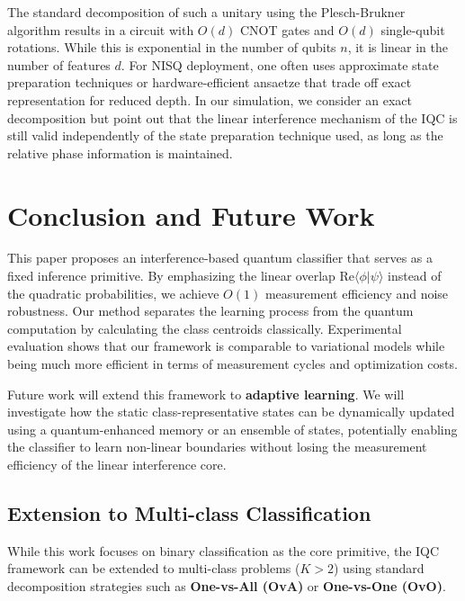\documentclass[conference]{IEEEtran}
\begin{document}
The standard decomposition of such a unitary using the Plesch-Brukner algorithm \cite{plesch2011quantum} results in a circuit with $O(d)$ CNOT gates and $O(d)$ single-qubit rotations. While this is exponential in the number of qubits $n$, it is linear in the number of features $d$. For NISQ deployment, one often uses approximate state preparation techniques or hardware-efficient ansaetze that trade off exact representation for reduced depth. In our simulation, we consider an exact decomposition but point out that the linear interference mechanism of the IQC is still valid independently of the state preparation technique used, as long as the relative phase information is maintained.

\section{Conclusion and Future Work}

This paper proposes an interference-based quantum classifier that serves as a fixed inference primitive. By emphasizing the linear overlap $\mathrm{Re}\langle \phi | \psi \rangle$ instead of the quadratic probabilities, we achieve $O(1)$ measurement efficiency and noise robustness. Our method separates the learning process from the quantum computation by calculating the class centroids classically. Experimental evaluation shows that our framework is comparable to variational models while being much more efficient in terms of measurement cycles and optimization costs.

Future work will extend this framework to \textbf{adaptive learning}. We will investigate how the static class-representative states can be dynamically updated using a quantum-enhanced memory or an ensemble of states, potentially enabling the classifier to learn non-linear boundaries without losing the measurement efficiency of the linear interference core.

\subsection{Extension to Multi-class Classification}

While this work focuses on binary classification as the core primitive, the IQC framework can be extended to multi-class problems ($K > 2$) using standard decomposition strategies such as \textbf{One-vs-All (OvA)} or \textbf{One-vs-One (OvO)}.
\end{document}
